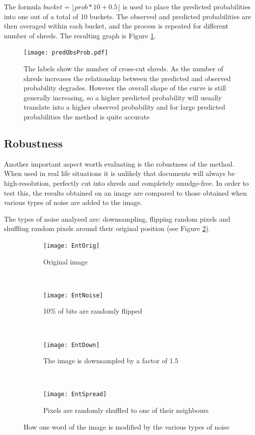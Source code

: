 The formula $bucket = \lfloor prob * 10 + 0.5\rfloor$ is used to place the predicted probabilities into one out of a total of 10 buckets. The observed and predicted probabilities are then averaged within each bucket, and the process is repeated for different number of shreds. The resulting graph is Figure \ref{fig:probComp}.
\begin{figure}[h]
\centering
\texttt{[image: predObsProb.pdf]}
\caption{The labels show the number of cross-cut shreds. As the number of shreds increases the relationship between the predicted and observed probability degrades. However the overall shape of the curve is still generally increasing, so a higher predicted probability will usually translate into a higher observed probability and for large predicted probabilities the method is quite accurate}
\label{fig:probComp}
\end{figure}

\subsection{Robustness}
\label{chap4Rob}
Another important aspect worth evaluating is the robustness of the method. When used in real life situations it is unlikely that documents will always be high-resolution, perfectly cut into shreds and completely smudge-free. In order to test this, the results obtained on an image are compared to those obtained when various types of noise are added to the image. 

The types of noise analysed are: downsampling, flipping random pixels and shuffling random pixels around their original position (see Figure \ref{fig:noiseTypes}). 

\begin{figure}[H]
        \centering
        \begin{subfigure}[b]{0.4\textwidth}
                \centering
                \texttt{[image: EntOrig]}
                \caption{Original image}
        \end{subfigure}
        ~ 
        \begin{subfigure}[b]{0.4\textwidth}
                \centering
                \texttt{[image: EntNoise]}
                \caption{10\% of bits are randomly flipped}
        \end{subfigure}
        ~ 
        \begin{subfigure}[b]{0.4\textwidth}
                \centering
                \texttt{[image: EntDown]}
                \caption{The image is downsampled by a factor of 1.5}
        \end{subfigure}
        ~ 
        \begin{subfigure}[b]{0.4\textwidth}
                \centering
                \texttt{[image: EntSpread]}
                \caption{Pixels are randomly shuffled to one of their neighbours}
        \end{subfigure}
        \caption{How one word of the image is modified by the various types of noise}
        \label{fig:noiseTypes}
\end{figure}

